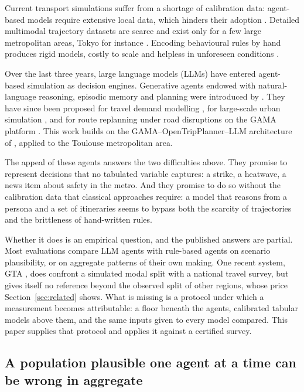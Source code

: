 Current transport simulations suffer from a shortage of calibration data: agent-based models require extensive local data, which hinders their adoption \citep{liu2024toward}. Detailed multimodal trajectory datasets are scarce and exist only for a few large metropolitan areas, Tokyo for instance \citep{feng2024agentmove,fourez2025transport}. Encoding behavioural rules by hand produces rigid models, costly to scale and helpless in unforeseen conditions \citep{liu2024toward,alves2026evaluating}.

Over the last three years, large language models (LLMs) have entered agent-based simulation as decision engines. Generative agents endowed with natural-language reasoning, episodic memory and planning were introduced by \citet{park2023generative}. They have since been proposed for travel demand modelling \citep{liu2024toward}, for large-scale urban simulation \citep{bougie2025citysim}, and for route replanning under road disruptions on the GAMA platform \citep{alves2026evaluating}. This work builds on the GAMA--OpenTripPlanner--LLM architecture of \citet{vu2025modeling}, applied to the Toulouse metropolitan area.

The appeal of these agents answers the two difficulties above. They promise to represent decisions that no tabulated variable captures: a strike, a heatwave, a news item about safety in the metro. And they promise to do so without the calibration data that classical approaches require: a model that reasons from a persona and a set of itineraries seems to bypass both the scarcity of trajectories and the brittleness of hand-written rules.

Whether it does is an empirical question, and the published answers are partial. Most evaluations compare LLM agents with rule-based agents on scenario plausibility, or on aggregate patterns of their own making. One recent system, GTA \citep{lammer2026gta}, does confront a simulated modal split with a national travel survey, but gives itself no reference beyond the observed split of other regions, whose price Section~\ref{sec:related} shows. What is missing is a protocol under which a measurement becomes attributable: a floor beneath the agents, calibrated tabular models above them, and the same inputs given to every model compared. This paper supplies that protocol and applies it against a certified survey.

\subsection{A population plausible one agent at a time can be wrong in aggregate}
\label{sec:gap}

